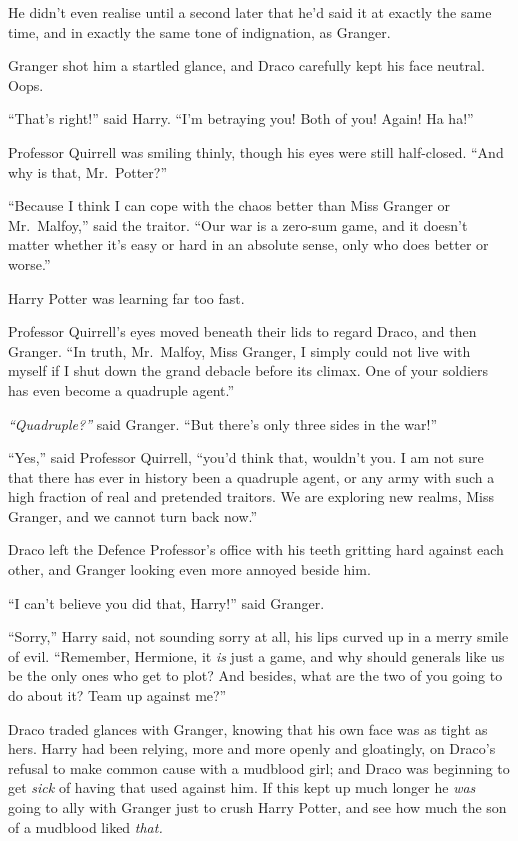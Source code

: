 He didn't even realise until a second later that he'd said it at exactly
the same time, and in exactly the same tone of indignation, as Granger.

Granger shot him a startled glance, and Draco carefully kept his face
neutral. Oops.

``That's right!'' said Harry. ``I'm betraying you! Both of you! Again!
Ha ha!''

Professor Quirrell was smiling thinly, though his eyes were still
half-closed. ``And why is that, Mr.~Potter?''

``Because I think I can cope with the chaos better than Miss Granger or
Mr.~Malfoy,'' said the traitor. ``Our war is a zero-sum game, and it
doesn't matter whether it's easy or hard in an absolute sense, only who
does better or worse.''

Harry Potter was learning far too fast.

Professor Quirrell's eyes moved beneath their lids to regard Draco, and
then Granger. ``In truth, Mr.~Malfoy, Miss Granger, I simply could not
live with myself if I shut down the grand debacle before its climax. One
of your soldiers has even become a quadruple agent.''

\emph{``Quadruple?''} said Granger. ``But there's only three sides in
the war!''

``Yes,'' said Professor Quirrell, ``you'd think that, wouldn't you. I am
not sure that there has ever in history been a quadruple agent, or any
army with such a high fraction of real and pretended traitors. We are
exploring new realms, Miss Granger, and we cannot turn back now.''

Draco left the Defence Professor's office with his teeth gritting hard
against each other, and Granger looking even more annoyed beside him.

``I can't believe you did that, Harry!'' said Granger.

``Sorry,'' Harry said, not sounding sorry at all, his lips curved up in
a merry smile of evil. ``Remember, Hermione, it \emph{is} just a game,
and why should generals like us be the only ones who get to plot? And
besides, what are the two of you going to do about it? Team up against
me?''

Draco traded glances with Granger, knowing that his own face was as
tight as hers. Harry had been relying, more and more openly and
gloatingly, on Draco's refusal to make common cause with a mudblood
girl; and Draco was beginning to get \emph{sick} of having that used
against him. If this kept up much longer he \emph{was} going to ally
with Granger just to crush Harry Potter, and see how much the son of a
mudblood liked \emph{that.}

